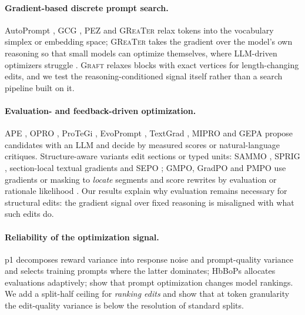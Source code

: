 \documentclass{article}
\newcommand{\graft}{\textsc{Graft}}
\newcommand{\greater}{\textsc{GReaTer}}
\begin{document}
\paragraph{Gradient-based discrete prompt search.} AutoPrompt \citep{shin2020autoprompt},
GCG \citep{zou2023gcg}, PEZ \citep{wen2023hard} and \greater{} \citep{das2025greater}
relax tokens into the vocabulary simplex or embedding space; \greater{} takes the
gradient over the model's own reasoning so that small models can optimize themselves,
where LLM-driven optimizers struggle \citep{zhang2024revisiting}. \graft{} relaxes blocks
with exact vertices for length-changing edits, and we test the reasoning-conditioned
signal itself rather than a search pipeline built on it.

\paragraph{Evaluation- and feedback-driven optimization.} APE \citep{zhou2023ape}, OPRO
\citep{yang2024opro}, ProTeGi \citep{pryzant2023protegi}, EvoPrompt \citep{guo2024evoprompt},
TextGrad \citep{yuksekgonul2024textgrad}, MIPRO \citep{opsahl2024mipro} and GEPA
\citep{agrawal2026gepa} propose candidates with an LLM and decide by measured scores or
natural-language critiques. Structure-aware variants edit sections or typed units:
SAMMO \citep{schnabel2024sammo}, SPRIG \citep{zhang2024sprig}, section-local textual
gradients \citep{sharma2026mpo} and SEPO \citep{ma2026sepo}; GMPO, GradPO and PMPO use
gradients or masking to \emph{locate} segments and score rewrites by evaluation or
rationale likelihood \citep{zhao2026gmpo,chakma2026gradpo,zhao2025pmpo}. Our results
explain why evaluation remains necessary for structural edits: the gradient signal over
fixed reasoning is misaligned with what such edits do.

\paragraph{Reliability of the optimization signal.} p1 \citep{gao2026p1} decomposes reward
variance into response noise and prompt-quality variance and selects training prompts
where the latter dominates; HbBoPs \citep{schneider2025hbbops} allocates evaluations
adaptively; \citet{sadjoli2025optimization} show that prompt optimization changes model
rankings. We add a split-half ceiling for \emph{ranking edits} and show that at token
granularity the edit-quality variance is below the resolution of standard splits.
\end{document}
